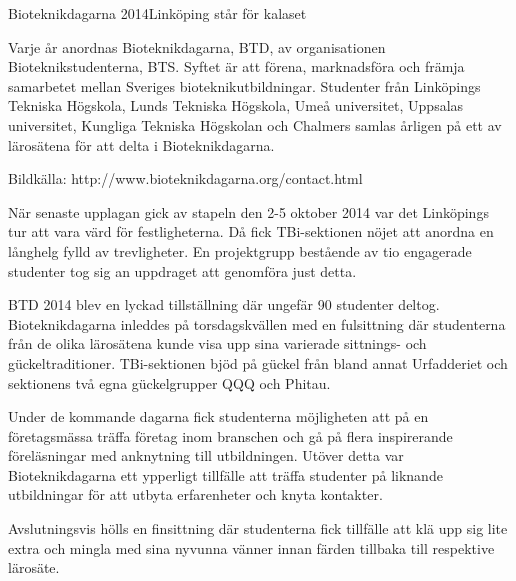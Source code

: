 \begin{news}{2}{Bioteknikdagarna 2014}{Linköping står för kalaset}{}{}


Varje år anordnas Bioteknikdagarna, BTD, av organisationen
Bioteknikstudenterna, BTS. Syftet är att förena, marknadsföra och
främja samarbetet mellan Sveriges bioteknikutbildningar. Studenter
från Linköpings Tekniska Högskola, Lunds Tekniska Högskola, Umeå
universitet, Uppsalas universitet, Kungliga Tekniska Högskolan och
Chalmers samlas årligen på ett av lärosätena för att delta i
Bioteknikdagarna.


Bildkälla: http://www.bioteknikdagarna.org/contact.html

När senaste upplagan gick av stapeln den 2-5 oktober 2014 var det
Linköpings tur att vara värd för festligheterna. Då fick TBi-sektionen
nöjet att anordna en långhelg fylld av trevligheter.  En projektgrupp
bestående av tio engagerade studenter tog sig an uppdraget att
genomföra just detta.

BTD 2014 blev en lyckad tillställning där ungefär 90 studenter
deltog. Bioteknikdagarna inleddes på torsdagskvällen med en
fulsittning där studenterna från de olika lärosätena kunde visa upp
sina varierade sittnings- och gückeltraditioner. TBi-sektionen bjöd på
gückel från bland annat Urfadderiet och sektionens två egna
gückelgrupper QQQ och Phitau.

Under de kommande dagarna fick studenterna möjligheten att på en
företagsmässa träffa företag inom branschen och gå på flera
inspirerande föreläsningar med anknytning till utbildningen. Utöver
detta var Bioteknikdagarna ett ypperligt tillfälle att träffa
studenter på liknande utbildningar för att utbyta erfarenheter och
knyta kontakter.

Avslutningsvis hölls en finsittning där studenterna fick tillfälle att
klä upp sig lite extra och mingla med sina nyvunna vänner innan färden
tillbaka till respektive lärosäte.
\end{news}
